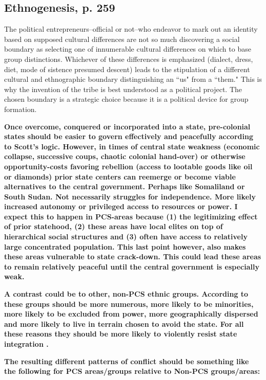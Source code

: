 \documentclass[12pt]{article}
\begin{document}
\subsection{Ethnogenesis, p. 259}

The political entrepreneurs--official or not--who endeavor to mark out an
identity based on supposed cultural differences are not so much discovering a
social boundary as selecting one of innumerable cultural differences on which to
base group distinctions. Whichever of these differences is emphasized (dialect,
dress, diet, mode of sistence presumed descent) leads to the stipulation
of a different cultural and ethnographic boundary distinguishing an ``us" from
a ``them." This is why the invention of the tribe is best understood as a
political project. The chosen boundary is a strategic choice because it is a
political device for group formation. 

\textbf{Once overcome, conquered or incorporated into a state, pre-colonial
states should be easier to govern effectively and peacefully according to Scott's
logic. However, in times of central state weakness (economic collapse, successive
coups, chaotic colonial hand-over) or otherwise opportunity-costs favoring
rebellion (access to lootable goods like oil or diamonds) prior state centers
can reemerge or become viable alternatives to the central government. Perhaps
like Somaliland or South Sudan. Not necessarily struggles for independence. More
likely increased autonomy or privileged access to resources or power. I expect
this to happen in PCS-areas because (1) the legitimizing effect of prior
statehood, (2) these areas have local elites on top of hierarchical social
structures \citep{Scott2009} and (3) often have access to relatively large
concentrated population. This last point however, also makes these areas
vulnerable to state crack-down. This could lead these areas to remain relatively
peaceful until the central government is especially weak.}

\textbf{A contrast could be to other, non-PCS ethnic groups. According to
\citet{Scott2009} these groups should be more numerous, more likely to be
minorities, more likely to be excluded from power, more geographically
dispersed and more likely to live in terrain chosen to avoid the state. For all
these reasons they should be more likely to violently resist state integration
\citep{Ying_2020, Scott2009}.}

\textbf{The resulting different patterns of conflict should be something like the
following for PCS areas/groups relative to Non-PCS groups/areas:}
\end{document}

